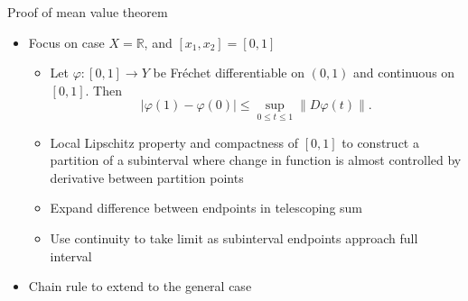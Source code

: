 \documentclass[]{beamer}
\begin{document}
	\begin{frame}{Proof of mean value theorem}
		\begin{itemize}
			\item Focus on case $X = \mathbb{R}$, and $[x_1, x_2] = [0, 1]$
			\begin{itemize}
				\item Let $\varphi : [0,1] \to Y$ be Fréchet differentiable on $(0,1)$ and continuous on $[0,1]$. Then
				\begin{equation*}
					|\varphi(1) - \varphi(0)| \le \sup_{0\le t\le1} \lVert D\varphi(t)\rVert.
				\end{equation*}
				\vfill
				\item Local Lipschitz property and compactness of $[0,1]$ to construct a partition of a subinterval where change in function is almost controlled by derivative between partition points
				\vfill
				\item Expand difference between endpoints in telescoping sum
				\vfill
				\item Use continuity to take limit as subinterval endpoints approach full interval
			\end{itemize}
			\vfill
			\item Chain rule to extend to the general case
		\end{itemize}
	\end{frame}
	
\end{document}
